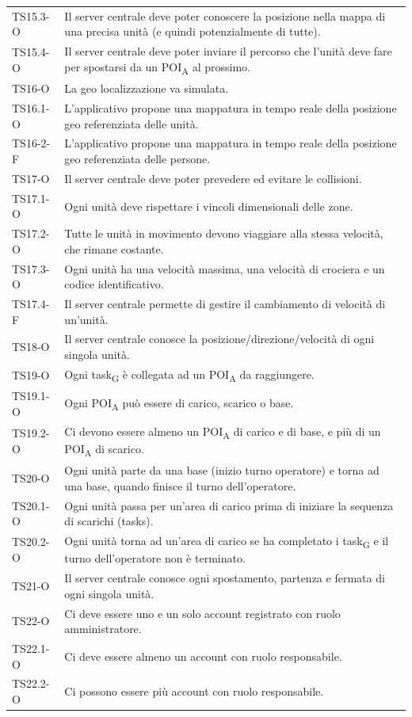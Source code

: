 \begin{longtable}{ >{\centering}p{} >{}p{}}
	TS15.3-O & Il server centrale deve poter conoscere la posizione nella mappa di una precisa unità (e quindi potenzialmente di tutte).\tabularnewline
	TS15.4-O & Il server centrale deve poter inviare il percorso che l'unità deve fare per spostarsi da un POI\textsubscript{A} al prossimo.\tabularnewline
	
	TS16-O & La geo localizzazione va simulata.\tabularnewline
	TS16.1-O & L'applicativo propone una mappatura in tempo reale della posizione geo referenziata delle unità.\tabularnewline
	TS16-2-F & L'applicativo propone una mappatura in tempo reale della posizione geo referenziata delle persone.\tabularnewline
	
	TS17-O & Il server centrale deve poter prevedere ed evitare le collisioni.\tabularnewline
	TS17.1-O & Ogni unità deve rispettare i vincoli dimensionali delle zone.\tabularnewline
	TS17.2-O & Tutte le unità in movimento devono viaggiare alla stessa velocità, che rimane costante.\tabularnewline
	TS17.3-O & Ogni unità ha una velocità massima, una velocità di crociera e un codice identificativo. \tabularnewline
	TS17.4-F & Il server centrale permette di gestire il cambiamento di velocità di un'unità.\tabularnewline
	
	TS18-O & Il server centrale conosce la posizione/direzione/velocità di ogni singola unità. \tabularnewline
	
	TS19-O & Ogni task\textsubscript{G} è collegata ad un POI\textsubscript{A} da raggiungere.\tabularnewline
	TS19.1-O & Ogni POI\textsubscript{A} può essere di carico, scarico o base.\tabularnewline
	TS19.2-O & Ci devono essere almeno un POI\textsubscript{A} di carico e di base, e più di un POI\textsubscript{A} di scarico.
	\tabularnewline
	
	TS20-O & Ogni unità parte da una base (inizio turno operatore) e torna ad una base, quando finisce il turno dell'operatore.\tabularnewline
	TS20.1-O & Ogni unità passa per un'area di carico prima di iniziare la sequenza di scarichi (tasks).\tabularnewline
	TS20.2-O & Ogni unità torna ad un'area di carico se ha completato i task\textsubscript{G} e il turno dell'operatore non è terminato.\tabularnewline
	TS21-O & Il server centrale conosce ogni spostamento, partenza e fermata di ogni singola unità.\tabularnewline
	TS22-O & Ci deve essere uno e un solo account registrato con ruolo amministratore.\tabularnewline
	TS22.1-O & Ci deve essere almeno un account con ruolo responsabile.\tabularnewline
	TS22.2-O & Ci possono essere più account con ruolo responsabile.\tabularnewline
	

\end{longtable}
